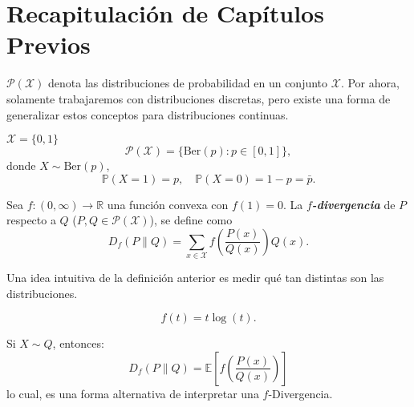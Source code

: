 \section{Recapitulaci\'on de
Cap\'itulos Previos}

\begin{notation}
$\mathcal{P}(\mathcal{X})$ denota las distribuciones de probabilidad en un conjunto $\mathcal{X}$. Por ahora, solamente trabajaremos con distribuciones discretas, pero existe una forma de generalizar estos conceptos para distribuciones continuas.
\end{notation}

\begin{example}
$\mathcal{X}=\{0,1\}$
\begin{equation*}
    \mathcal{P}(\mathcal{X})=\{\text{Ber}(p)\colon p\in[0,1]\},
\end{equation*}
donde $X\sim\text{Ber}(p)$,
\begin{equation*}
    \mathbb{P}(X=1)=p,\quad\mathbb{P}(X=0)=1-p=\bar{p}.
\end{equation*}
\end{example}

\begin{definition}
Sea $f\colon(0,\infty)\to\mathbb{R}$ una funci\'on convexa con $f(1)=0$. La \textit{\textbf{$f$-divergencia}} de $P$ respecto a $Q$ ($P,Q\in\mathcal{P}(\mathcal{X})$), se define como
\begin{equation*}
    D_f(P\|Q)=\sum_{x\in\mathcal{X}}f\left(\frac{P(x)}{Q(x)}\right)Q(x).
\end{equation*}
\end{definition}

\begin{observation}
Una idea intuitiva de la definici\'on anterior es medir qu\'e tan distintas son las distribuciones. 
\end{observation}

\begin{example}
\begin{equation*}
    f(t)=t\log(t).
\end{equation*}
\end{example}

\begin{observation}
    Si $X\sim Q$, entonces:
    \begin{equation*}
        D_f(P\|Q)=\mathbb{E}\left[f\left(\frac{P(x)}{Q(x)}\right)\right]
    \end{equation*}
    lo cual, es una forma alternativa de interpretar una $f$-Divergencia.
\end{observation}

